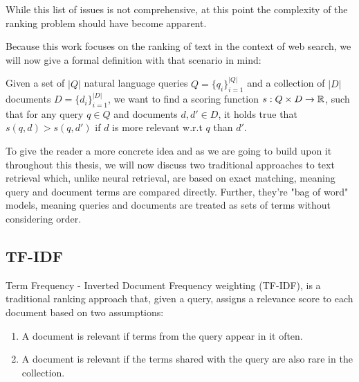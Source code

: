 While this list of issues is not comprehensive, at this point the complexity of the ranking problem should have become apparent.

Because this work focuses on the ranking of text in the context of web search, we will now give a formal definition with that scenario in mind:

Given a set of $|Q|$ natural language queries $Q = \{q_i\}_{i=1}^{|Q|}$ and a collection of $|D|$ documents $D = \{d_i\}_{i=1}^{|D|}$, we want to find a scoring function $s: Q \times D \rightarrow \mathbb{R}$, such that for any query $q \in Q$ and documents $d, d' \in D$, it holds true that $s(q, d) > s(q, d')$ if $d$ is more relevant w.r.t $q$ than $d'$.

To give the reader a more concrete idea and as we are going to build upon it throughout this thesis, we will now discuss two traditional approaches to text retrieval which, unlike neural retrieval, are based on exact matching, meaning query and document terms are compared directly. Further, they're "bag of word" models, meaning queries and documents are treated as sets of terms without considering order.

\subsection{TF-IDF}
Term Frequency - Inverted Document Frequency weighting (TF-IDF), is a traditional ranking approach that, given a query, assigns a relevance score to each document based on two assumptions:
\begin{enumerate}
    \item A document is relevant if terms from the query appear in it often.
    \item A document is relevant if the terms shared with the query are also rare in the collection.
\end{enumerate}


